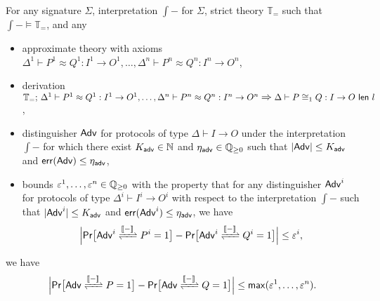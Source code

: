 \begin{lemma}\label{lem:soundness_cogruence_approximate_1}
For any \ipdl signature $\Sigma$, interpretation $\int{-}$ for $\Sigma$, strict \ipdl theory $\mathbb{T}_=$ such that $\int{-} \vDash \mathbb{T}_=$, and any
\begin{itemize}
\item approximate \ipdl theory with axioms $\Delta^1 \vdash P^1 \approx Q^1 : I^1 \to O^1, \ldots, \Delta^n \vdash P^n \approx Q^n : I^n \to O^n$,

\item derivation $\mathbb{T}_=; \, \Delta^1 \vdash P^1 \approx Q^1 : I^1 \to O^1, \ldots, \Delta^n \vdash P^n \approx Q^n : I^n \to O^n \; \mathlarger{\mathlarger{\Rightarrow}} \; \Delta \vdash \lapproxcong{P}{Q}{I}{O}{l}{1}$,

\item distinguisher $\mathsf{Adv}$ for protocols of type $\Delta \vdash I \to O$ under the interpretation $\int{-}$ for which there exist $K_{\mathsf{adv}} \in \mathbb{N}$ and $\eta_{\mathsf{adv}} \in \mathbb{Q}_{\geq 0}$ such that $|\mathsf{Adv}| \leq K_{\mathsf{adv}}$ and $\mathsf{err}(\mathsf{Adv}) \leq \eta_{\mathsf{adv}}$,

\item bounds $\varepsilon^1,\ldots,\varepsilon^n \in \mathbb{Q}_{\geq 0}$ with the property that for any distinguisher $\mathsf{Adv}^i$ for protocols of type $\Delta^i \vdash I^i \to O^i$ with respect to the interpretation $\int{-}$ such that $|\mathsf{Adv}^i| \leq K_{\mathsf{adv}}$ and $\mathsf{err}(\mathsf{Adv}^i) \leq \eta_{\mathsf{adv}}$, we have
\[\Big|\mathsf{Pr}\big[\interaction{\Adv^i}{P^i}{\int{-}} = 1\big] - \mathsf{Pr}\big[\interaction{\Adv^i}{Q^i}{\int{-}} = 1\big]\Big| \leq \varepsilon^i,\]
\end{itemize}
we have
\[\Big|\mathsf{Pr}\big[\interaction{\Adv}{P}{\int{-}} = 1\big] - \mathsf{Pr}\big[\interaction{\Adv}{Q}{\int{-}} = 1\big]\Big| \leq \max(\varepsilon^1,\ldots,\varepsilon^n).\]
\end{lemma}


